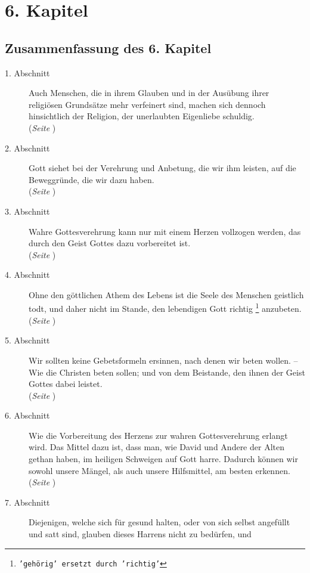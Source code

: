 

\chapter{6. Kapitel}  \label{kap6}

\section{Zusammenfassung des 6. Kapitel}
\footnotesize
\begin{description}
\item[1. Abschnitt] Auch Menschen, die in ihrem Glauben und in der Ausübung
ihrer religiösen Grundsätze mehr verfeinert sind, machen sich dennoch
hinsichtlich der Religion, der unerlaubten Eigenliebe schuldig.
\\(\textit{Seite \pageref{kap6_ab1}})
\item[2. Abschnitt] Gott siehet bei der Verehrung und Anbetung, die wir ihm
leisten, auf die Beweggründe, die wir dazu haben.
\\(\textit{Seite \pageref{kap6_ab2}})
\item[3. Abschnitt] Wahre Gottesverehrung kann nur mit einem Herzen vollzogen
werden, das durch den Geist Gottes dazu vorbereitet ist.
\\(\textit{Seite \pageref{kap6_ab3}})
\item[4. Abschnitt] Ohne den göttlichen Athem des Lebens ist die Seele des
Menschen geistlich todt, und daher nicht im Stande, den lebendigen Gott richtig
\footnote{\texttt{'gehörig' ersetzt durch 'richtig'}}
anzubeten.
\\(\textit{Seite \pageref{kap6_ab4}})
\item[5. Abschnitt] Wir sollten keine Gebetsformeln ersinnen, nach denen wir
beten wollen. -- Wie die Christen beten sollen; und von dem Beistande, den ihnen
der Geist Gottes dabei leistet.
\\(\textit{Seite \pageref{kap6_ab5}})
\item[6. Abschnitt] Wie die Vorbereitung des Herzens zur wahren Gottesverehrung
erlangt wird. Das Mittel dazu ist, dass man, wie David und Andere der Alten
gethan haben, im heiligen Schweigen auf Gott harre. Dadurch können wir sowohl
unsere Mängel, als auch unsere Hilfsmittel, am besten erkennen.
\\(\textit{Seite \pageref{kap6_ab6}})
\item[7. Abschnitt] Diejenigen, welche sich für gesund halten, oder von sich
selbst angefüllt und satt sind, glauben dieses Harrens nicht zu bedürfen, und

\end{description}
